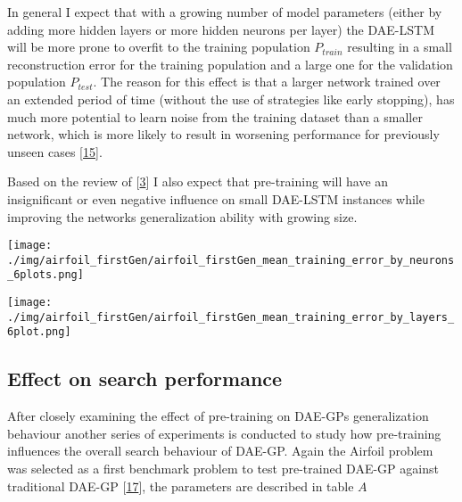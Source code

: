 \documentclass[
  11pt,
]{article}
\let\origfigure\figure
\let\endorigfigure\endfigure
\renewenvironment{figure}[1][2] {
    \expandafter\origfigure\expandafter[H]
} {
    \endorigfigure
}
\begin{document}
In general I expect that with a growing number of model parameters
(either by adding more hidden layers or more hidden neurons per layer)
the DAE-LSTM will be more prone to overfit to the training population
\(P_{train}\) resulting in a small reconstruction error for the training
population and a large one for the validation population \(P_{test}\).
The reason for this effect is that a larger network trained over an
extended period of time (without the use of strategies like early
stopping), has much more potential to learn noise from the training
dataset than a smaller network, which is more likely to result in
worsening performance for previously unseen cases
{[}\protect\hyperlink{ref-weigend1994overfitting}{15}{]}.

Based on the review of {[}\protect\hyperlink{ref-pmlr-v5-erhan09a}{3}{]}
I also expect that pre-training will have an insignificant or even
negative influence on small DAE-LSTM instances while improving the
networks generalization ability with growing size.

\begin{figure}
\centering
\texttt{[image: ./img/airfoil\_firstGen/airfoil\_firstGen\_mean\_training\_error\_by\_neurons\_6plots.png]}
\caption{First Generation Median Training Error for variable number of
hidden Neurons - Airfoil}
\end{figure}

\begin{figure}
\centering
\texttt{[image: ./img/airfoil\_firstGen/airfoil\_firstGen\_mean\_training\_error\_by\_layers\_6plot.png]}
\caption{First Generation Median Training Error for variable number of
hidden Layers - Airfoil}
\end{figure}

\hypertarget{effect-on-search-performance}{%
\subsection{Effect on search
performance}\label{effect-on-search-performance}}

After closely examining the effect of pre-training on DAE-GPs
generalization behaviour another series of experiments is conducted to
study how pre-training influences the overall search behaviour of
DAE-GP. Again the Airfoil problem was selected as a first benchmark
problem to test pre-trained DAE-GP against traditional DAE-GP
{[}\protect\hyperlink{ref-dae-gp_2022_symreg}{17}{]}, the parameters are
described in table \(A\)
\end{document}
